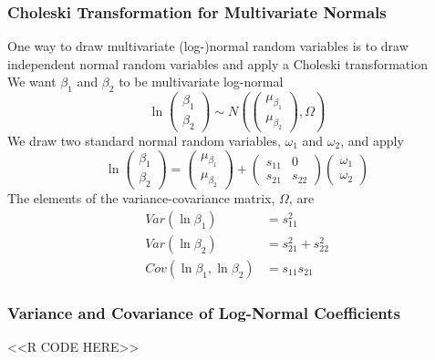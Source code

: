 \documentclass{beamer}
\begin{document}
\begin{frame}\frametitle{Choleski Transformation for Multivariate Normals}
    One way to draw multivariate (log-)normal random variables is to draw independent normal random variables and apply a Choleski transformation \\
    \vspace{2ex}
    We want $\beta_1$ and $\beta_2$ to be multivariate log-normal
	$$\ln
		\begin{pmatrix}
    		\beta_1 \\
    		\beta_2
    	\end{pmatrix}
    	\sim N \left(
    	\begin{pmatrix}
    		\mu_{\beta_1} \\
    		\mu_{\beta_2}
    	\end{pmatrix},
      \Omega \right)$$
    We draw two standard normal random variables, $\omega_1$ and $\omega_2$, and apply
    $$\ln
		\begin{pmatrix}
    		\beta_1 \\
    		\beta_2
    	\end{pmatrix}
    	= 
    	\begin{pmatrix}
    		\mu_{\beta_1} \\
    		\mu_{\beta_2}
    	\end{pmatrix}
    	+
    	\begin{pmatrix}
    		s_{11} & 0 \\
    		s_{21} & s_{22}
    	\end{pmatrix}
    	\begin{pmatrix}
    		\omega_1 \\
    		\omega_2
    	\end{pmatrix}$$
    The elements of the variance-covariance matrix, $\Omega$, are
    \begin{align*}
    	Var(\ln \beta_1) &= s_{11}^2 \\
    	Var(\ln \beta_2) &= s_{21}^2 + s_{22}^2 \\
    	Cov(\ln \beta_1, \ln \beta_2) &= s_{11} s_{21}	
    \end{align*}
\end{frame}

\begin{frame}[fragile]\frametitle{Variance and Covariance of Log-Normal Coefficients}
    <<R CODE HERE>>
\end{frame}
\end{document}
